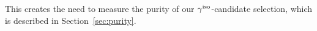 This creates the need to measure the purity of our $\gamma^\mathrm{iso}$-candidate selection, which is described in Section~\ref{sec:purity}. 






